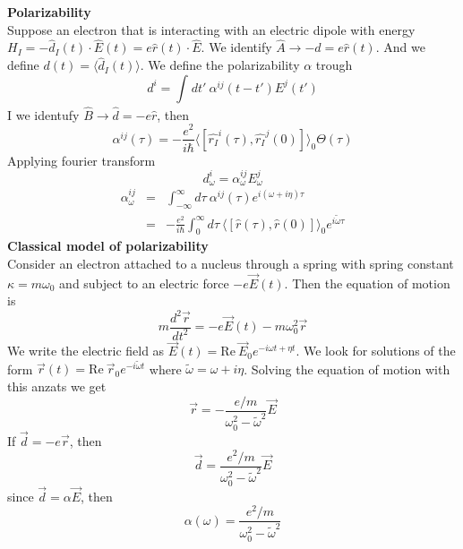 \documentclass[12pt,a4paper]{article}
\newcommand{\integral}[3]{\int_{#1}^{#2} d #3 \ } %
\begin{document}
\textbf{Polarizability}\\
Suppose an electron that is interacting with an electric dipole with energy $H_I = -\hat{d}_I(t) \cdot \hat{E}(t) = e\hat{r}(t)\cdot\hat{E}$. We identify $\hat{A}\rightarrow -\hat{d}= e\hat{r}(t)$. And we define $d(t) = \langle \hat{d}_I(t) \rangle$. We define the polarizability $\alpha$ trough
\begin{equation}
	d^i = \integral{}{}{t'} \alpha^{ij}(t-t')E^j(t')
\end{equation}
I we identufy $\hat{B} \rightarrow \hat{d}=-e\hat{r}$, then
 \begin{equation}
 	\alpha^{ij}(\tau) = -\frac{e^2}{i\hbar}\langle [\hat{r_I}^i(\tau),\hat{r_I}^j(0)]\rangle_0 \Theta(\tau)
 \end{equation}
Applying fourier transform 
\begin{equation}
	d_{\omega}^i = \alpha_{\omega}^{ij} E_{\omega}^j
\end{equation}
\begin{eqnarray}
	\alpha_{\omega}^{ij} & = & \integral{-\infty}{\infty}{\tau} \alpha^{ij}(\tau) e^{i(\omega+i\eta)\tau}\\
	& = & -\frac{e^2}{i\hbar}\integral{0}{\infty}{\tau} \langle [\hat{r}(\tau),\hat{r}(0)]\rangle_0 e^{i\tilde \omega \tau}
\end{eqnarray}
\textbf{Classical model of polarizability}\\
Consider an electron attached to a nucleus through a spring with spring constant $\kappa = m\omega_0$ and subject to an electric force $-e\vec{E}(t) $. Then the equation of motion is
\begin{equation}
	m\frac{d^2 \vec{r}}{dt^2} = - e\vec{E}(t)-m\omega_0^2\vec{r}
\end{equation} 
We write the electric field as $\vec{E}(t) = \text{Re} \ \vec{E}_0 e^{-i\omega t + \eta t}$. We look for solutions of the form $\vec{r}(t) = \text{Re} \  \vec{r}_0 e^{-i\tilde\omega t}$ where $\tilde{\omega} = \omega + i\eta$. Solving the equation of motion with this anzats we get 
\begin{equation}
	\vec{r} = -\frac{e/m}{\omega_0^2 - \tilde{\omega}^2}\vec{E}
\end{equation}
If $\vec{d} = -e\vec{r}$, then
\begin{equation}
	\vec{d} = \frac{e^2/m}{\omega_0^2 - \tilde{\omega}^2}\vec{E}
\end{equation}
since $\vec{d} = \alpha \vec{E}$, then
\begin{equation}
	\alpha(\omega) = \frac{e^2/m}{\omega_0^2 - \tilde{\omega}^2}
\end{equation}
\end{document}
